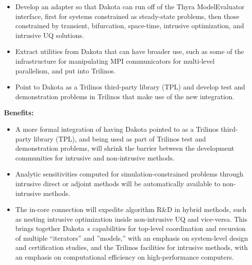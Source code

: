 \documentclass[pdf,ps2pdf,11pt]{SANDreport}
\begin{document}
\begin{itemize}

{}\item{}Develop an adapter so that Dakota can run off of the Thyra
ModelEvaluator interface, first for systems constrained as steady-state
problems, then those constrained by transient, bifurcation, space-time,
intrusive optimization, and intrusive UQ solutions.

{}\item{}Extract utilities from Dakota that can have broader use, such as some
of the infrastructure for manipulating MPI communicators for multi-level
parallelism, and put into Trilinos.

{}\item{}Point to Dakota as a Trilinos third-party library (TPL) and develop
test and demonstration problems in Trilinos that make use of the new
integration.

\end{itemize}

{}\noindent\textbf{Benefits:}

\begin{itemize}

{}\item{}A more formal integration of having Dakota pointed to as a Trilinos
third-party library (TPL), and being used as part of Trilinos test and
demonstration problems, will shrink the barrier between the development
communities for intrusive and non-intrusive methods.

{}\item{}Analytic sensitivities computed for simulation-constrained problems
through intrusive direct or adjoint methods will be automatically available to
non-intrusive methods.

{}\item{}The in-core connection will expedite algorithm R\&D in hybrid
methods, such as nesting intrusive optimization inside non-intrusive UQ and
vice-versa. This brings together Dakota~s capabilities for top-level
coordination and recursion of multiple ``iterators'' and ''models,'' with an
emphasis on system-level design and certification studies, and the Trilinos
facilities for intrusive methods, with an emphasis on computational efficiency
on high-performance computers.

\end{itemize}

\end{document}
